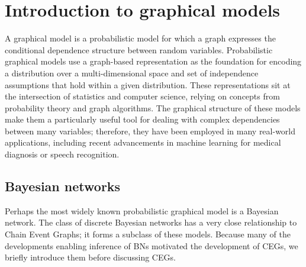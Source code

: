 \documentclass[runningheads]{llncs}
\begin{document}
%
%
\section{Introduction to graphical models}\label{sec:graphicalintro}
A graphical model is a probabilistic model for which a graph expresses the conditional dependence structure between random variables. Probabilistic graphical models use a graph-based representation as the foundation for encoding a distribution over a multi-dimensional space and set of independence assumptions that hold within a given distribution. These representations sit at the intersection of statistics and computer science, relying on concepts from probability theory and graph algorithms. The graphical structure of these models make them a particularly useful tool for dealing with complex dependencies between many variables; therefore, they have been employed in many real-world applications, including recent advancements in machine learning for medical diagnosis or speech recognition.

\subsection{Bayesian networks}\label{subsec:bayesiannetworks}
Perhaps the most widely known probabilistic graphical model is a Bayesian network. The class of discrete Bayesian networks has a very close relationship to Chain Event Graphs; it forms a subclass of these models. Because many of the developments enabling inference of BNs motivated the development of CEGs, we briefly introduce them before discussing CEGs. 
\end{document}
